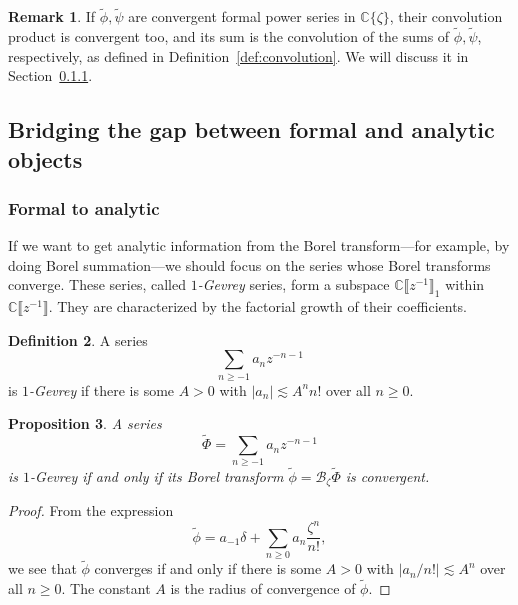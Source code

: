\documentclass{article}
\newcommand{\C}{\mathbb{C}}
\newcommand{\series}[1]{\tilde{#1}}
\newcommand{\borel}{\mathcal{B}}
\theoremstyle{definition}
\newtheorem{definition}{Definition}[section]
\newtheorem{remark}[definition]{Remark}
\theoremstyle{plain}
\newtheorem{prop}[definition]{Proposition}
\begin{document}
\begin{remark}
If $\series{\phi}, \series{\psi}$ are convergent formal power series in $\C\{\zeta\}$, their convolution product is convergent too, and its sum is the convolution of the sums of $\series{\phi}, \series{\psi}$, respectively, as defined in Definition~\ref{def:convolution}. We will discuss it in Section~\ref{sec:Borel-gevrey}.
\end{remark}
%
\subsection{Bridging the gap between formal and analytic objects}\label{sec:bridging}
%
%
\subsubsection{Formal to analytic}\label{sec:Borel-gevrey}
%
If we want to get analytic information from the Borel transform---for example, by doing Borel summation---we should focus on the series whose Borel transforms converge. These series, called {\em $1$-Gevrey} series, form a subspace $\C \llbracket z^{-1} \rrbracket_1$ within $\C \llbracket z^{-1} \rrbracket$. They are characterized by the factorial growth of their coefficients.
\begin{definition}
A series
\[ \sum_{n \ge -1} a_n z^{-n-1} \]
is {\em $1$-Gevrey} if there is some $A > 0$ with $|a_n| \lesssim A^n n!$ over all $n \ge 0$.
\end{definition}
\begin{prop}\label{prop:gevrey_to_convergent}
A series
\[ \series{\Phi} = \sum_{n \ge -1} a_n z^{-n-1} \]
is $1$-Gevrey if and only if its Borel transform $\series{\phi} = \borel_\zeta \series{\Phi}$ is convergent.
\end{prop}
\begin{proof}
From the expression
\[ \series{\phi} = a_{-1} \delta + \sum_{n \ge 0} a_n \frac{\zeta^n}{n!}, \]
we see that $\series{\phi}$ converges if and only if there is some $A > 0$ with $|a_n / n!| \lesssim A^n$ over all $n \ge 0$. The constant $A$ is the radius of convergence of $\series{\phi}$.
\end{proof}
\end{document}
